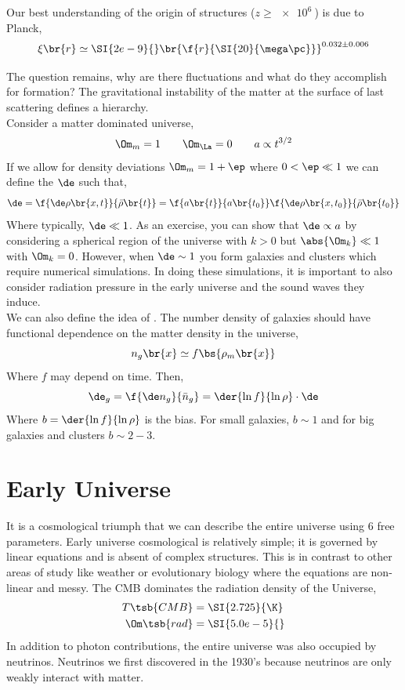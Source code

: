 \documentclass{article}
\begin{document}
Our best understanding of the origin of structures ($z \geq \SI{e6}{}$) is due to Planck,
\[ \xi\br{r} \simeq \SI{2e-9}{}\br{\f{r}{\SI{20}{\mega \pc}}}^{0.032\pm 0.006} \]


The question remains, why are there fluctuations and what do they accomplish for formation? The gravitational instability of the matter at the surface of last scattering defines a hierarchy. \\

Consider a matter dominated universe,
\[ \Om_m = 1 \qquad \Om_{\La} = 0 \qquad a \propto t^{3/2} \]
If we allow for density deviations $\Om_m = 1 + \ep$ where $0 < \ep \ll 1$ we can define the  $\de$ such that,
\[ \de = \f{\de \rho\br{x, t}}{\bar \rho\br{t}} = \f{a\br{t}}{a\br{t_0}} \f{\de \rho\br{x, t_0}}{\bar \rho\br{t_0}} \]
Where typically, $\de \ll 1$. As an exercise, you can show that $\de \propto a$ by considering a spherical region of the universe with $k > 0$ but $\abs{\Om_k} \ll 1$ with $\Om_k = 0$. However, when $\de \sim 1$ you form galaxies and clusters which require numerical simulations. In doing these simulations, it is important to also consider radiation pressure in the early universe and the sound waves they induce.\\

We can also define the idea of . The number density of galaxies should have functional dependence on the matter density in the universe,
\[ n_g\br{x} \simeq f\bs{\rho_m\br{x}} \]
Where $f$ may depend on time. Then,
\[ \de_g = \f{\de n_g}{\bar n_g} = \der{\ln f}{\ln \rho} \cdot \de  \]
Where $b = \der{\ln f}{\ln \rho}$ is the bias. For small galaxies, $b \sim 1$ and for big galaxies and clusters $b \sim 2-3$.


\section{Early Universe}

It is a cosmological triumph that we can describe the entire universe using $6$ free parameters. Early universe cosmological is relatively simple; it is governed by linear equations and is absent of complex structures. This is in contrast to other areas of study like weather or evolutionary biology where the equations are non-linear and messy. The CMB dominates the radiation density of the Universe,
\begin{align*}
    T\tsb{CMB} &= \SI{2.725}{\K}\\
    \Om\tsb{rad} &= \SI{5.0e-5}{}
\end{align*}
In addition to photon contributions, the entire universe was also occupied by neutrinos. Neutrinos we first discovered in the 1930's because neutrinos are only weakly interact with matter. \\
\end{document}

